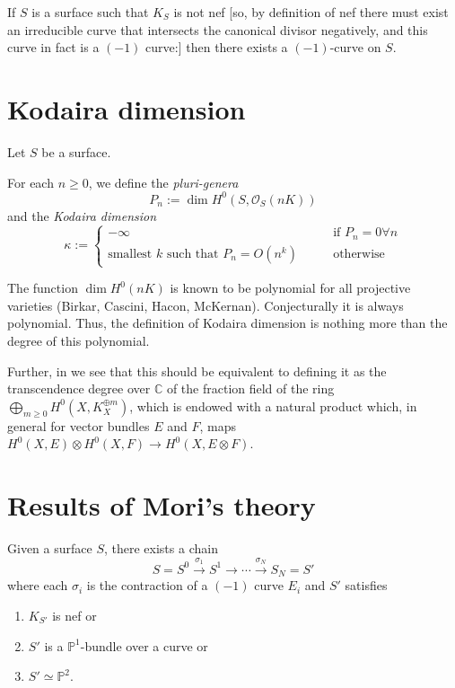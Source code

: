 \noindent
If $S$ is a surface such that $K_S$ is not
nef
[so, by definition of nef there must exist
an irreducible curve that intersects
the canonical divisor negatively, and this
curve
in fact is a $(-1)$ curve:]
then there exists a $(-1)$-curve on $S$.




\section{Kodaira dimension}
\label{section-kodaira-dimension}

\noindent
Let $S$ be a surface.

\begin{definition}
\label{definition-kodaira-dimension}
For each $n \geq 0$,
we define the {\it pluri-genera}
$$
P_n:= \dim H^0(S,\mathcal{O}_S(n K))
$$
and the {\it Kodaira dimension}
$$
\kappa:=
\begin{cases}
-\infty&\qquad \text{if }P_n=0\forall n \\
\text{smallest $k$ such that }
P_n=O(n^k)&\qquad \text{otherwise}
\end{cases}
$$
\end{definition}

\begin{remark} \label{remark-kodaira}
The function $\dim H^0(n K)$ is
known to be polynomial for all
projective varieties (Birkar, Cascini, Hacon,
McKernan). Conjecturally it is
always polynomial. Thus, the definition of
Kodaira dimension is nothing
more than the degree of this polynomial.

Further, in \cite[Definition 2.2.26]{huc} we
see
that this should be equivalent to defining it
as the
transcendence degree over $\mathbb{C}$
of the fraction field of the ring
$\bigoplus_{m \geq 0}H^0(X,K_X^{\oplus m})$,
which is endowed with a natural product
which, in general for
vector bundles $E$ and $F$, maps
$H^0(X,E) \otimes H^0(X,F) \to H^0(X,E
\otimes F)$.
\end{remark}

\section{Results of Mori's theory}
\label{section-results-of-mori}

\begin{theorem}
\label{theorem-one}
Given a surface $S$,
there exists a chain
$$
S=S^0 \xrightarrow{\sigma_1} S^1 \to \cdots
\xrightarrow{\sigma_N}S_N=S'
$$
where each $\sigma_i$ is the contraction of a
$(-1)$ curve $E_i$
and $S'$ satisfies
\begin{enumerate}
\item $K_{S'}$ is nef or
\item $S'$ is a $\mathbb{P}^1$-bundle
over a curve or
\item $S' \simeq \mathbb{P}^2$.
\end{enumerate}
\end{theorem}

